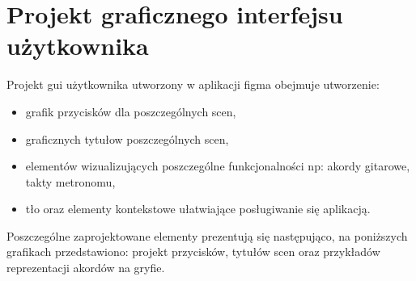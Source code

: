 


\section{Projekt graficznego interfejsu użytkownika}

Projekt gui użytkownika utworzony w aplikacji figma obejmuje utworzenie:

\begin{itemize}
	\item grafik przycisków dla poszczególnych scen,
	\item graficznych tytułow poszczególnych scen,
	\item elementów wizualizujących poszczególne funkcjonalności np: akordy gitarowe, takty metronomu,
	\item tło oraz elementy kontekstowe ułatwiające posługiwanie się aplikacją.
\end{itemize}

Poszczególne zaprojektowane elementy prezentują się następująco, na poniższych grafikach przedstawiono: projekt przycisków, tytułów scen oraz przykładów reprezentacji akordów na gryfie. 



